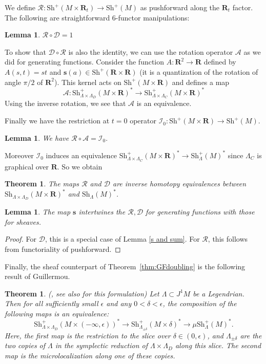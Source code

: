 \documentclass[12pt,a4paper]{article}
\numberwithin{equation}{section}
\newtheorem{thm}[equation]{Theorem}
\newtheorem{theorem}[equation]{Theorem}
\newtheorem{lemma}[equation]{Lemma}
\theoremstyle{definition}
\theoremstyle{remark}
\newcommand{\A}{\mathcal{A}}
\newcommand{\R}{\mathbf{R}}
\newcommand{\DD}{\mathcal{D}}
\newcommand{\RR}{\mathcal{R}}
\newcommand{\s}{\mathbf{s}}
\newcommand{\Sh}{\mathrm{Sh}}
\newcommand{\II}{\mathcal{I}}
\begin{document}
We define
$\mathcal{R}: \Sh^+(M \times \R_t) \to \Sh^+(M)$ as pushforward along the $\R_t$ factor.  The following are straightforward 6-functor manipulations:

\begin{lemma} \label{sheaf r after d}
    $\mathcal{R}  \circ \mathcal{D} = 1$
\end{lemma}

To show that $\DD\circ \RR$ is also the identity, we can use the rotation operator $\A$
as we did for generating functions. Consider the function $A:\R^2\to \R$ defined by $A(s,t)=st$
and $\s(a)\in\Sh^+(\R\times \R)$ (it is a quantization of the rotation of angle $\pi/2$ of $\R^2$).
This kernel acts on $\Sh^+(M\times \R)$ and defines a map
\[\A:\Sh^+_{\Lambda\times \Lambda_D}(M\times \R)^*\to \Sh^+_{\Lambda\times \Lambda_C}(M\times \R)^*\]
Using the inverse rotation, we see that $\A$ is an equivalence.

Finally we have the restriction at $t=0$ operator $\II_0:\Sh^+(M\times \R)\to \Sh^+(M)$.


\begin{lemma}
We have
$\RR\circ \A=\II_0.$
\end{lemma}
Moreover $\II_0$ induces an equivalence $\Sh^+_{\Lambda\times \Lambda_C}(M\times \R)^* \to \Sh^+_\Lambda(M)^*$
since $\Lambda_C$ is graphical over $\R$.
So we obtain

\begin{thm}\label{thm:Sh_RD}
The maps $\RR$ and $\DD$ are inverse homotopy equivalences between $\Sh_{\Lambda\times \Lambda_D}(M\times \R)^*$ and $\Sh_\Lambda(M)^*$.
\end{thm}

\begin{lemma} \label{s intertwines}
    The map $\s$ intertwines the $\mathcal{R}, \mathcal{D}$ for generating functions with those for sheaves.
\end{lemma}
\begin{proof}
    For $\mathcal{D}$, this is a special case of Lemma \ref{s and sum}.  For $\mathcal{R}$, this follows from functoriality of pushforward.
\end{proof}

Finally, the sheaf counterpart of Theorem~\ref{thm:GFdoubling} is the following result of Guillermou.

\begin{theorem}  (\cite{Guillermou}, see also \cite{Nadler-Shende} for this  formulation) \label{thm:Shdoubling}
    Let $\Lambda \subset J^1 M$ be a Legendrian. Then for all sufficiently small $\epsilon$ and any $0 < \delta < \epsilon$, the composition of the following maps is an equivalence:
    $$\Sh_{\Lambda \times \Lambda_D}^+(M \times (-\infty, \epsilon))^* \to \Sh^+_{\Lambda_{\pm \delta}}(M \times \delta)^* \to \mu \Sh^+_\Lambda(M)^*.$$
    Here, the first map is the restriction to the slice over $\delta \in (0, \epsilon)$, and $\Lambda_{\pm \delta}$ are the two copies of $\Lambda$ in the symplectic reduction of $\Lambda \times \Lambda_D$ along this slice. The second map is the microlocalization along one of these copies.
\end{theorem}
\end{document}
